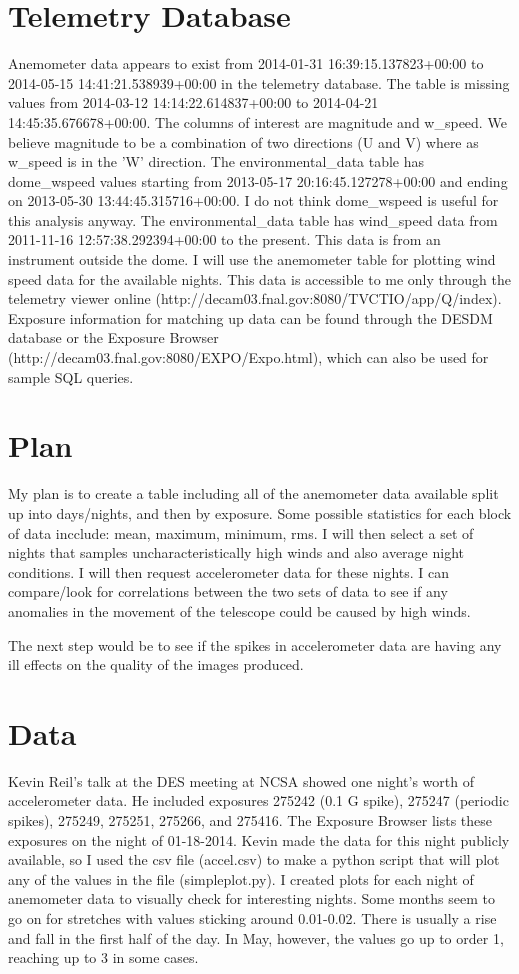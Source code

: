\documentclass{article}
\begin{document}
\section{Telemetry Database}
Anemometer data appears to exist from 2014-01-31 16:39:15.137823+00:00 to 2014-05-15 14:41:21.538939+00:00 in the telemetry database. 
The table is missing values from 2014-03-12 14:14:22.614837+00:00 to 2014-04-21 14:45:35.676678+00:00.
The columns of interest are magnitude and w\_speed. We believe magnitude to be a combination of two directions (U and V) where as w\_speed is in the 'W' direction. 
The environmental\_data table has dome\_wspeed values starting from 2013-05-17 20:16:45.127278+00:00 and ending on 2013-05-30 13:44:45.315716+00:00. I do not think dome\_wspeed is useful for this analysis anyway. 
The environmental\_data table has wind\_speed data from 2011-11-16 12:57:38.292394+00:00 to the present. This data is from an instrument outside the dome.
I will use the anemometer table for plotting wind speed data for the available nights. This data is accessible to me only through the telemetry viewer online (http://decam03.fnal.gov:8080/TVCTIO/app/Q/index). Exposure information for matching up data can be found through the DESDM database or the Exposure Browser (http://decam03.fnal.gov:8080/EXPO/Expo.html), which can also be used for sample SQL queries. 

\section{Plan}
My plan is to create a table including all of the anemometer data available split up into days/nights, and then by exposure. Some possible statistics for each block of data incclude: mean, maximum, minimum, rms. 
I will then select a set of nights that samples uncharacteristically high winds and also average night conditions. 
I will then request accelerometer data for these nights. 
I can compare/look for correlations between the two sets of data to see if any anomalies in the movement of the telescope could be caused by high winds. 

The next step would be to see if the spikes in accelerometer data are having any ill effects on the quality of the images produced. 

\section{Data}

Kevin Reil's talk at the DES meeting at NCSA showed one night's worth of accelerometer data. 
He included exposures 275242 (0.1 G spike), 275247 (periodic spikes), 275249, 275251, 275266, and 275416. 
The Exposure Browser lists these exposures on the night of 01-18-2014. 
Kevin made the data for this night publicly available, so I used the csv file (accel.csv) to make a python script that will plot any of the values in the file (simpleplot.py).
I created plots for each night of anemometer data to visually check for interesting nights. 
Some months seem to go on for stretches with values sticking around 0.01-0.02. There is usually a rise and fall in the first half of the day.
In May, however, the values go up to order 1, reaching up to 3 in some cases.
\end{document}
